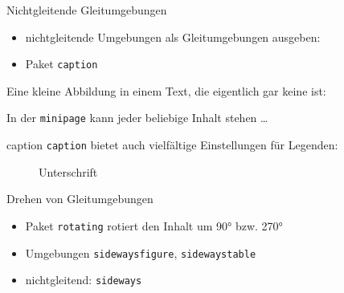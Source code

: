 \documentclass{beamer}
\newcommand{\pkg}[1]{\texttt{#1}}
\begin{document}
\begin{frame}[fragile]{Nichtgleitende Gleitumgebungen}
\begin{itemize}
\item nichtgleitende Umgebungen als Gleitumgebungen ausgeben:
\item[] Paket \pkg{caption}
\end{itemize}
\begin{LTXexample}[pos=b]
Eine kleine Abbildung in einem Text, die eigentlich gar keine ist:
\begin{minipage}[b]{3cm}
\end{minipage}
In der \verb/minipage/ kann jeder beliebige Inhalt stehen \dots
\end{LTXexample}
\end{frame}

\begin{frame}[fragile]{caption}
\verb/caption/ bietet auch vielfältige Einstellungen für Legenden:

\begin{LTXexample}[pos=b]
\captionsetup[figure]{textfont=bf, labelsep=period}
\captionsetup[table]{
  textfont=it, singlelinecheck=false, labelsep=newline, format=plain, justification=justified
}

\begin{figure}
\centering
{}
\caption{Unterschrift}
\end{figure}
\end{LTXexample}
\end{frame}

\begin{frame}[fragile]{Drehen von Gleitumgebungen}
\begin{itemize}
\item Paket \verb/rotating/ rotiert den Inhalt um 90° bzw. 270°
\item Umgebungen \verb/sidewaysfigure/, \verb/sidewaystable/
\item nichtgleitend: \verb/sideways/
\end{itemize}
\begin{LTXexample}[width=.4\textwidth]
\centering
\begin{sideways}
[Bild]
\end{sideways}
\end{LTXexample}
\end{frame}
\end{document}
